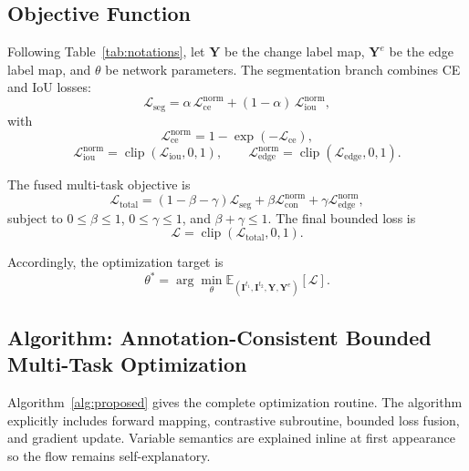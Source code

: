 \subsection{Objective Function}\label{sec:Methodology:ObjectiveFunction}
Following Table~\ref{tab:notations}, let $\mathbf{Y}$ be the change label map, $\mathbf{Y}^{e}$ be the edge label map, and $\theta$ be network parameters. The segmentation branch combines CE and IoU losses:
\begin{equation}
    \mathcal{L}_{\text{seg}}
    =
    \alpha\,\mathcal{L}_{\text{ce}}^{\text{norm}}
    +
    (1-\alpha)\,\mathcal{L}_{\text{iou}}^{\text{norm}},
    \label{eq:segmentation_fusion}
\end{equation}
with
\begin{equation}
    \mathcal{L}_{\text{ce}}^{\text{norm}}=1-\exp\left(-\mathcal{L}_{\text{ce}}\right),
    \label{eq:ce_normalization}
\end{equation}
\begin{equation}
    \mathcal{L}_{\text{iou}}^{\text{norm}}=\operatorname{clip}(\mathcal{L}_{\text{iou}},0,1),
    \qquad
    \mathcal{L}_{\text{edge}}^{\text{norm}}=\operatorname{clip}(\mathcal{L}_{\text{edge}},0,1).
    \label{eq:edge_iou_normalization}
\end{equation}

The fused multi-task objective is
\begin{equation}
    \mathcal{L}_{\text{total}}
    =
    (1-\beta-\gamma)\mathcal{L}_{\text{seg}}
    +
    \beta\mathcal{L}_{\text{con}}^{\text{norm}}
    +
    \gamma\mathcal{L}_{\text{edge}}^{\text{norm}},
    \label{eq:total_objective}
\end{equation}
subject to $0\le\beta\le1$, $0\le\gamma\le1$, and $\beta+\gamma\le1$. The final bounded loss is
\begin{equation}
    \mathcal{L}=\operatorname{clip}(\mathcal{L}_{\text{total}},0,1).
    \label{eq:final_objective}
\end{equation}

Accordingly, the optimization target is
\begin{equation}
    \theta^{*}
    =
    \arg\min_{\theta}
    \mathbb{E}_{\left(\mathbf{I}^{t_1},\mathbf{I}^{t_2},\mathbf{Y},\mathbf{Y}^{e}\right)}
    \left[\mathcal{L}\right].
    \label{eq:argmin_objective}
\end{equation}

\subsection{Algorithm: Annotation-Consistent Bounded Multi-Task Optimization}\label{sec:Methodology:Algorithm}
Algorithm~\ref{alg:proposed} gives the complete optimization routine. The algorithm explicitly includes forward mapping, contrastive subroutine, bounded loss fusion, and gradient update. Variable semantics are explained inline at first appearance so the flow remains self-explanatory.

